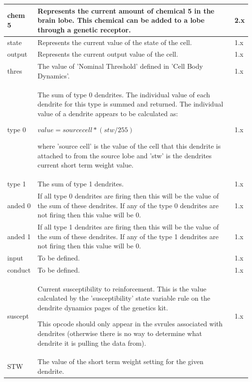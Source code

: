 \documentclass[11pt,twoside,a4paper]{article}
\begin{document}
\begin{longtable}[h]{|p{}|p{}|p{}|}
	chem 5				&	Represents the current amount of chemical 5 in the brain lobe. This chemical can be added to a lobe through a genetic receptor.		&	2.x		\\ \hline
	state				&	Represents the current value of the state of the cell.																				&	1.x		\\ \hline
	output				&	Represents the current output value of the cell.																					&	1.x		\\ \hline
	thres				&	The value of 'Nominal Threshold' defined in 'Cell Body Dynamics'.																	&	1.x		\\ \hline
	type 0				&	
	
	The sum of type 0 dendrites. The individual value of each dendrite for this type is summed and returned. The individual value of a dendrite appears to be calculated as:
	
	$value = source cell * (stw/255)$
	
	where 'source cell' is the value of the cell that this dendrite is attached to from the source lobe and 'stw' is the dendrites current short term weight value.
																																								&	1.x		\\ \hline
	type 1				&	The sum of type 1 dendrites.																										&	1.x		\\ \hline
	anded 0				&	If all type 0 dendrites are firing then this will be the value of the sum of these dendrites. If any of the type 0 dendrites are not firing then this value will be 0.	&	1.x		\\ \hline
	anded 1				&	If all type 1 dendrites are firing then this will be the value of the sum of these dendrites. If any of the type 1 dendrites are not firing then this value will be 0.	&	1.x		\\ \hline
	input				&	To be defined.	&	1.x		\\ \hline
	conduct				&	To be defined.	&	1.x		\\ \hline
	suscept				&	
	
	Current susceptibility to reinforcement. This is the value calculated by the 'susceptibility' state variable rule on the dendrite dynamics pages of the genetics kit.
	
	This opcode should only appear in the svrules associated with dendrites (otherwise there is no way to determine what dendrite it is pulling the data from).
											&	1.x		\\ \hline
	STW					&	
	
	The value of the short term weight setting for the given dendrite.
	

\end{longtable}
\end{document}
